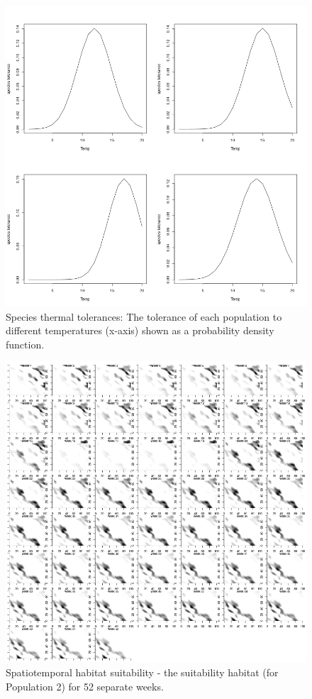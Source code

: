 \documentclass[review]{elsarticle}
\begin{document}
\begin{figure}[!ht]
	\includegraphics[width = \linewidth]{Plots/Species_tolerances}
	\caption{Species thermal tolerances: The tolerance of each population
		to different temperatures (x-axis) shown as a probability
		density function.}
	\label{fig:4}
\end{figure}

\begin{figure}[!ht]
	\includegraphics[width = \linewidth]{Plots/habitat_spatiotemp_spp_2}
	\caption{Spatiotemporal habitat suitability - the suitability habitat
		(for Population 2) for 52 separate weeks.}
	\label{fig:6}
\end{figure}
\end{document}
